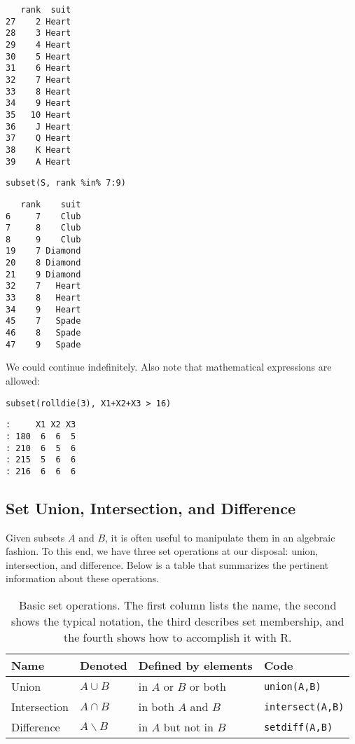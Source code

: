 \begin{verbatim}
   rank  suit
27    2 Heart
28    3 Heart
29    4 Heart
30    5 Heart
31    6 Heart
32    7 Heart
33    8 Heart
34    9 Heart
35   10 Heart
36    J Heart
37    Q Heart
38    K Heart
39    A Heart
\end{verbatim}

\begin{Verbatim}
subset(S, rank %in% 7:9)
\end{Verbatim}

\begin{verbatim}
   rank    suit
6     7    Club
7     8    Club
8     9    Club
19    7 Diamond
20    8 Diamond
21    9 Diamond
32    7   Heart
33    8   Heart
34    9   Heart
45    7   Spade
46    8   Spade
47    9   Spade
\end{verbatim}

We could continue indefinitely. Also note that mathematical
expressions are allowed:

\begin{Verbatim}
subset(rolldie(3), X1+X2+X3 > 16) 
\end{Verbatim}

\begin{verbatim}
:     X1 X2 X3
: 180  6  6  5
: 210  6  5  6
: 215  5  6  6
: 216  6  6  6
\end{verbatim}

\subsection{Set Union, Intersection, and Difference}
\label{sec-4-2-3}

Given subsets \(A\) and \(B\), it is often useful to manipulate them
in an algebraic fashion. To this end, we have three set operations at
our disposal: union, intersection, and difference. Below is a table
that summarizes the pertinent information about these operations.

\begin{table}[htb]
\caption[Set operations]{Basic set operations.  The first column lists the name, the second shows the typical notation, the third describes set membership, and the fourth shows how to accomplish it with R.}
\centering
\begin{tabular}{llll}
\hline
Name & Denoted & Defined by elements & Code\\
\hline
Union & \(A\cup B\) & in \(A\) or \(B\) or both & \texttt{union(A,B)}\\
Intersection & \(A\cap B\) & in both \(A\) and \(B\) & \texttt{intersect(A,B)}\\
Difference & \(A\backslash B\) & in \(A\) but not in \(B\) & \texttt{setdiff(A,B)}\\
\hline
\end{tabular}
\end{table}

